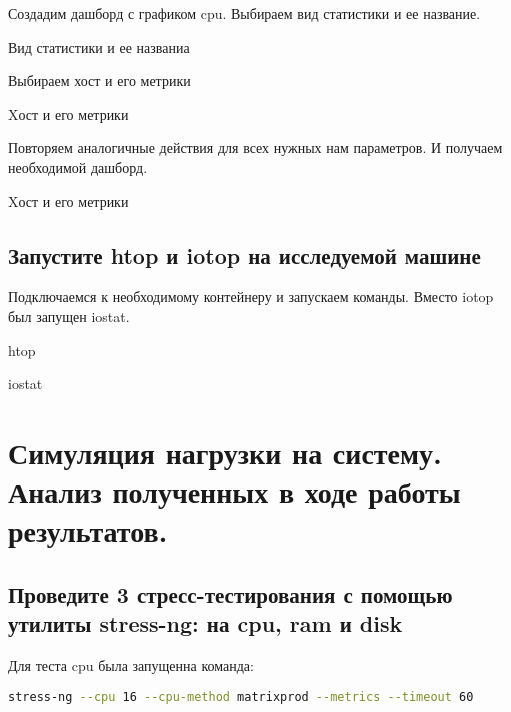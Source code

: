 Создадим дашборд с графиком cpu.
Выбираем вид статистики и ее название.

\begin{image}
    \caption{Вид статистики и ее названиа}
    \label{fig:cpu-hed}
\end{image}

Выбираем хост и его метрики

\begin{image}
    \caption{Xост и его метрики}
    \label{fig:cpu-bot}
\end{image}

Повторяем аналогичные действия для всех нужных нам параметров.
И получаем необходимой дашборд.

\begin{image}
    \caption{Xост и его метрики}
    \label{fig:alldash-board.png}
\end{image}


\subsection{Запустите htop и iotop на исследуемой машине}

Подключаемся к необходимому контейнеру и запускаем команды.
Вместо iotop был запущен iostat.

\begin{image}
    \caption{htop}
    \label{fig:htop}
\end{image}

\begin{image}
    \caption{iostat}
    \label{fig:iostat}
\end{image}
\section{Симуляция нагрузки на систему. Анализ полученных в ходе работы
результатов.}
\subsection{Проведите 3 стресс-тестирования с помощью утилиты stress-ng: на cpu, ram и
disk}

Для теста cpu была запущенна команда:

\begin{lstlisting}[language=bash]
stress-ng --cpu 16 --cpu-method matrixprod --metrics --timeout 60
\end{lstlisting}


